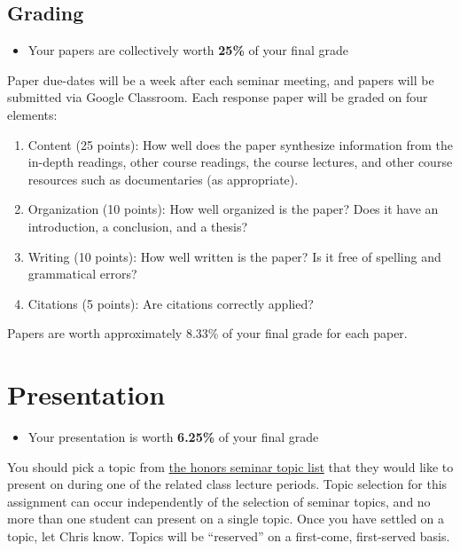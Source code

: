 \documentclass[]{book}
\providecommand{\tightlist}{%
  \setlength{\itemsep}{0pt}\setlength{\parskip}{0pt}}
\newenvironment{rmdblock}[1]
  {\begin{shaded*}
  \begin{itemize}
  \renewcommand{\labelitemi}{
    \raisebox{-.7\height}[0pt][0pt]{
      {\setkeys{Gin}{width=3em,keepaspectratio}\texttt{[image: images/\#1]}}
    }
  }
  \item
  }
  {
  \end{itemize}
  \end{shaded*}
  }
\newenvironment{rmdtip}
  {\begin{rmdblock}{tip}}
  {\end{rmdblock}}
\theoremstyle{definition}
\theoremstyle{definition}
\theoremstyle{definition}
\theoremstyle{remark}
\begin{document}
\hypertarget{grading-1}{%
\subsection{Grading}\label{grading-1}}

\begin{rmdtip}
Your papers are collectively worth \textbf{25\%} of your final grade
\end{rmdtip}

Paper due-dates will be a week after each seminar meeting, and papers
will be submitted via Google Classroom. Each response paper will be
graded on four elements:

\begin{enumerate}
\def\labelenumi{\arabic{enumi}.}
\tightlist
\item
  Content (25 points): How well does the paper synthesize information
  from the in-depth readings, other course readings, the course
  lectures, and other course resources such as documentaries (as
  appropriate).
\item
  Organization (10 points): How well organized is the paper? Does it
  have an introduction, a conclusion, and a thesis?
\item
  Writing (10 points): How well written is the paper? Is it free of
  spelling and grammatical errors?
\item
  Citations (5 points): Are citations correctly applied?
\end{enumerate}

Papers are worth approximately 8.33\% of your final grade for each
paper.

\hypertarget{presentation}{%
\section{Presentation}\label{presentation}}

\begin{rmdtip}
Your presentation is worth \textbf{6.25\%} of your final grade
\end{rmdtip}

You should pick a topic from \href{/honors-seminar-topics.html}{the
honors seminar topic list} that they would like to present on during one
of the related class lecture periods. Topic selection for this
assignment can occur independently of the selection of seminar topics,
and no more than one student can present on a single topic. Once you
have settled on a topic, let Chris know. Topics will be ``reserved'' on
a first-come, first-served basis.
\end{document}
